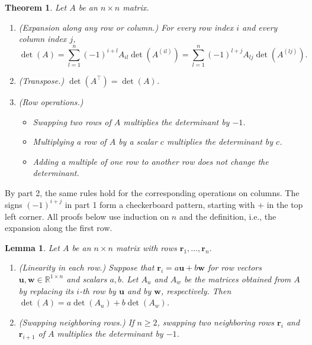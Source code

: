 \documentclass[11pt]{article}
\theoremstyle{definition}
\theoremstyle{plain}
\newtheorem{theorem}[definition]{Theorem}
\newtheorem{lemma}[definition]{Lemma}
\theoremstyle{remark}
\begin{document}
\begin{theorem}\label{thm:det-props}
    Let $A$ be an $n \times n$ matrix.
    \begin{enumerate}
        \item (Expansion along any row or column.) For every row index $i$ and every column index $j$,
        \[\det(A) = \sum_{l=1}^n (-1)^{i+l} A_{il} \det(A^{(il)}) = \sum_{l=1}^n (-1)^{l+j} A_{lj} \det(A^{(lj)}).\]
        \item (Transpose.) $\det(A^\top) = \det(A)$.
        \item (Row operations.)
        \begin{itemize}
            \item Swapping two rows of $A$ multiplies the determinant by $-1$.
            \item Multiplying a row of $A$ by a scalar $c$ multiplies the determinant by $c$.
            \item Adding a multiple of one row to another row does not change the determinant.
        \end{itemize}
    \end{enumerate}
\end{theorem}

By part 2, the same rules hold for the corresponding operations on columns. The signs $(-1)^{i+j}$ in part 1 form a checkerboard pattern, starting with $+$ in the top left corner. All proofs below use induction on $n$ and the definition, i.e., the expansion along the first row.

\begin{lemma}\label{lem:det-rows}
    Let $A$ be an $n \times n$ matrix with rows $\mathbf{r}_1, \ldots, \mathbf{r}_n$.
    \begin{enumerate}
        \item (Linearity in each row.) Suppose that $\mathbf{r}_i = a\mathbf{u} + b\mathbf{w}$ for row vectors $\mathbf{u}, \mathbf{w} \in \mathbb{R}^{1 \times n}$ and scalars $a, b$. Let $A_u$ and $A_w$ be the matrices obtained from $A$ by replacing its $i$-th row by $\mathbf{u}$ and by $\mathbf{w}$, respectively. Then $\det(A) = a\det(A_u) + b\det(A_w)$.
        \item (Swapping neighboring rows.) If $n \geq 2$, swapping two neighboring rows $\mathbf{r}_i$ and $\mathbf{r}_{i+1}$ of $A$ multiplies the determinant by $-1$.
    \end{enumerate}
\end{lemma}
\end{document}

